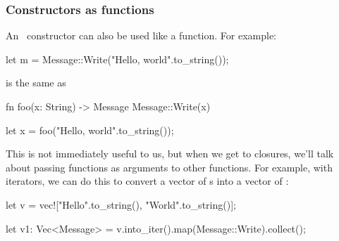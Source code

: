 \subsubsection*{Constructors as functions}

An \enum\ constructor can also be used like a function. For example:

\begin{rustc}
let m = Message::Write("Hello, world".to_string());
\end{rustc}

is the same as

\begin{rustc}
fn foo(x: String) -> Message {
    Message::Write(x)
}

let x = foo("Hello, world".to_string());
\end{rustc}

This is not immediately useful to us, but when we get to closures, we'll talk about passing functions as arguments to other functions. 
For example, with iterators, we can do this to convert a vector of \String s into a vector of :

\begin{rustc}
let v = vec!["Hello".to_string(), "World".to_string()];

let v1: Vec<Message> = v.into_iter().map(Message::Write).collect();
\end{rustc}

